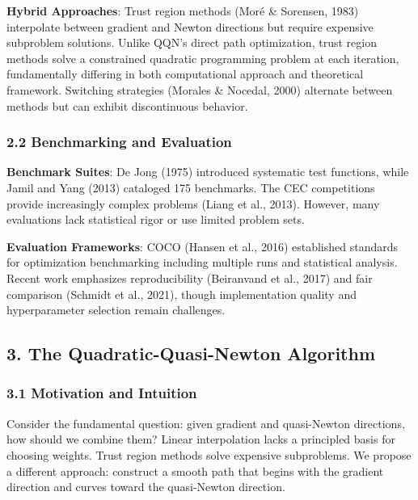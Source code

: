 \textbf{Hybrid Approaches}: Trust region methods (Moré \& Sorensen, 1983) interpolate between gradient and Newton directions
but require expensive subproblem solutions. Unlike QQN's direct path optimization, trust region methods solve a
constrained quadratic programming problem at each iteration, fundamentally differing in both computational approach
and theoretical framework. Switching strategies (Morales \& Nocedal, 2000) alternate between methods but
can exhibit discontinuous behavior.

\hypertarget{benchmarking-and-evaluation}{%
\subsubsection{2.2 Benchmarking and Evaluation}\label{benchmarking-and-evaluation}}

\textbf{Benchmark Suites}: De Jong (1975) introduced systematic test functions, while Jamil and Yang (2013) cataloged 175
benchmarks. The CEC competitions provide increasingly complex problems (Liang et al., 2013). However, many evaluations
lack statistical rigor or use limited problem sets.

\textbf{Evaluation Frameworks}: COCO (Hansen et al., 2016) established standards for optimization benchmarking including
multiple runs and statistical analysis. Recent work emphasizes reproducibility (Beiranvand et al., 2017) and fair
comparison (Schmidt et al., 2021), though implementation quality and hyperparameter selection remain challenges.

\hypertarget{the-quadratic-quasi-newton-algorithm}{%
\subsection{3. The Quadratic-Quasi-Newton Algorithm}\label{the-quadratic-quasi-newton-algorithm}}

\hypertarget{motivation-and-intuition}{%
\subsubsection{3.1 Motivation and Intuition}\label{motivation-and-intuition}}

Consider the fundamental question: given gradient and quasi-Newton directions, how should we combine them? Linear
interpolation lacks a principled basis for choosing weights. Trust region methods solve expensive subproblems. We
propose a different approach: construct a smooth path that begins with the gradient direction and curves toward the
quasi-Newton direction.

